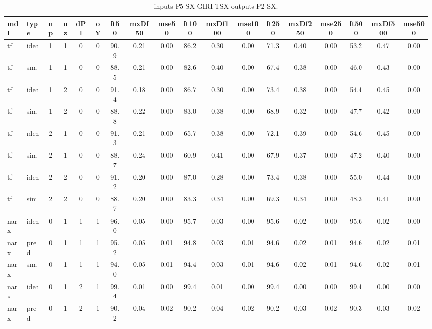 \begin{landscape} 
 \begin{center} 
 \footnotesize 
 \begin{longtable}{ll|cccc|ccc|ccc|ccc|ccc} 
\caption[inputs P5 SX GIRI TSX   outputs P2 SX]{inputs P5 SX GIRI TSX   outputs P2 SX.} 
\label{tab:inputs_P5_SX_GIRI_TSX___outputs_P2_SX} 
\hline 
  mdl & type & np & nz & dPl & oY & ft50 & mxDf50 & mse50 & ft100 & mxDf100 & mse100 & ft250 & mxDf250 & mse250 & ft500 & mxDf500 & mse500 \\ 
 \hline 
tf  & iden & 1 & 1 & 0 & 0 & 90.9 & 0.21 & 0.00 & 86.2 & 0.30 & 0.00 & 71.3 & 0.40 & 0.00 & 53.2 & 0.47 & 0.00 \\ 
tf  & sim  & 1 & 1 & 0 & 0 & 88.5 & 0.21 & 0.00 & 82.6 & 0.40 & 0.00 & 67.4 & 0.38 & 0.00 & 46.0 & 0.43 & 0.00 \\ 
 \hline 
tf  & iden & 1 & 2 & 0 & 0 & 91.4 & 0.18 & 0.00 & 86.7 & 0.30 & 0.00 & 73.4 & 0.38 & 0.00 & 54.4 & 0.45 & 0.00 \\ 
tf  & sim  & 1 & 2 & 0 & 0 & 88.8 & 0.22 & 0.00 & 83.0 & 0.38 & 0.00 & 68.9 & 0.32 & 0.00 & 47.7 & 0.42 & 0.00 \\ 
 \hline 
tf  & iden & 2 & 1 & 0 & 0 & 91.3 & 0.21 & 0.00 & 65.7 & 0.38 & 0.00 & 72.1 & 0.39 & 0.00 & 54.6 & 0.45 & 0.00 \\ 
tf  & sim  & 2 & 1 & 0 & 0 & 88.7 & 0.24 & 0.00 & 60.9 & 0.41 & 0.00 & 67.9 & 0.37 & 0.00 & 47.2 & 0.40 & 0.00 \\ 
 \hline 
tf  & iden & 2 & 2 & 0 & 0 & 91.2 & 0.20 & 0.00 & 87.0 & 0.28 & 0.00 & 73.4 & 0.38 & 0.00 & 55.0 & 0.44 & 0.00 \\ 
tf  & sim  & 2 & 2 & 0 & 0 & 88.7 & 0.20 & 0.00 & 83.3 & 0.34 & 0.00 & 69.3 & 0.34 & 0.00 & 48.3 & 0.41 & 0.00 \\ 
 \hline 
narx & iden & 0 & 1 & 1 & 1 & 96.0 & 0.05 & 0.00 & 95.7 & 0.03 & 0.00 & 95.6 & 0.02 & 0.00 & 95.6 & 0.02 & 0.00 \\ 
narx & pred & 0 & 1 & 1 & 1 & 95.2 & 0.05 & 0.01 & 94.8 & 0.03 & 0.01 & 94.6 & 0.02 & 0.01 & 94.6 & 0.02 & 0.01 \\ 
narx & sim  & 0 & 1 & 1 & 1 & 94.0 & 0.05 & 0.01 & 94.4 & 0.03 & 0.01 & 94.6 & 0.02 & 0.01 & 94.6 & 0.02 & 0.01 \\ 
 \hline 
narx & iden & 0 & 1 & 2 & 1 & 99.4 & 0.01 & 0.00 & 99.4 & 0.01 & 0.00 & 99.4 & 0.00 & 0.00 & 99.4 & 0.00 & 0.00 \\ 
narx & pred & 0 & 1 & 2 & 1 & 90.2 & 0.04 & 0.02 & 90.2 & 0.04 & 0.02 & 90.2 & 0.03 & 0.02 & 90.3 & 0.03 & 0.02 \\ 

\end{longtable}
\end{center}
\end{landscape}
